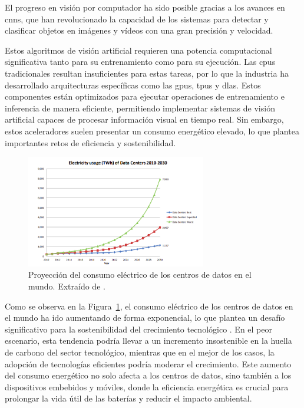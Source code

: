 \documentclass[11pt,spanish,listoffigures,listoftables]{tfgetsinf}
\begin{document}
El progreso en visión por computador ha sido posible gracias a los avances en \glspl{cnn}, que han revolucionado la capacidad de los sistemas para detectar y clasificar objetos en imágenes y vídeos con una gran precisión y velocidad.

Estos algoritmos de visión artificial requieren una potencia computacional significativa tanto para su entrenamiento como para su ejecución. Las \glspl{cpu} tradicionales resultan insuficientes para estas tareas, por lo que la industria ha desarrollado arquitecturas específicas como las \glspl{gpu}\cite[cap. ~3, pp. ~2-7]{hwu2022programming}, \glspl{tpu}\cite{google2025tpu} y \glspl{dla}\cite{nvidia_dla}. Estos componentes están optimizados para ejecutar operaciones de entrenamiento e inferencia de manera eficiente, permitiendo implementar sistemas de visión artificial capaces de procesar información visual en tiempo real. Sin embargo, estos aceleradores suelen presentar un consumo energético elevado, lo que plantea importantes retos de eficiencia y sostenibilidad.



\begin{figure}[H]
   \centering
   \includegraphics[width=0.7\textwidth]{images/introduccion/consumo_electrico_datacenters.png}
   \caption[Proyección del consumo eléctrico de los centros de datos en el mundo]{Proyección del consumo eléctrico de los centros de datos en el mundo. Extraído de \cite[fig. 4, p. ~17]{challe6010117}.}
\label{fig:consumo_electrico_datacenters}
\end{figure}

Como se observa en la Figura~\ref{fig:consumo_electrico_datacenters}, el consumo eléctrico de los centros de datos en el mundo ha ido aumentando de forma exponencial, lo que plantea un desafío significativo para la sostenibilidad del crecimiento tecnológico \cite{challe6010117}. En el peor escenario, esta tendencia podría llevar a un incremento insostenible en la huella de carbono del sector tecnológico, mientras que en el mejor de los casos, la adopción de tecnologías eficientes podría moderar el crecimiento. Este aumento del consumo energético no solo afecta a los centros de datos, sino también a los dispositivos embebidos y móviles, donde la eficiencia energética es crucial para prolongar la vida útil de las baterías y reducir el impacto ambiental.
\end{document}
